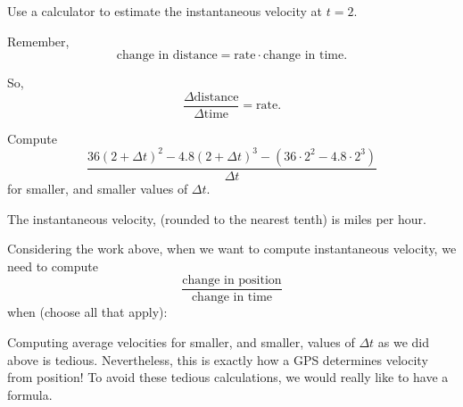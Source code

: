 \documentclass{ximera}
\begin{document}
\begin{problem}
  Use a calculator to estimate the instantaneous velocity at $t=2$.
  \begin{hint}
    Remember, 
    \[
    \text{change in distance} = \text{rate}\cdot\text{change in time}.
    \]
  \end{hint}
  \begin{hint}
    So, 
    \[
    \frac{\Delta\text{distance}}{\Delta\text{time}} = \text{rate}.
    \]
  \end{hint}
  \begin{hint}
    Compute
    \[
    \frac{36(2+\Delta t)^2 -4.8(2+\Delta t)^3 -\left(36\cdot 2^2 -4.8\cdot 2^3\right) }{\Delta t}
    \]
    for smaller, and smaller values of $\Delta t$.
  \end{hint}
  \begin{prompt}
    The instantaneous velocity, (rounded to the nearest tenth) is  miles per hour.
  \end{prompt}
\end{problem}


\begin{problem}
  Considering the work above, when we want to compute instantaneous
  velocity, we need to compute
  \[
  \frac{\text{change in position}}{\text{change in time}}
  \]
  when (choose all that apply):
 \begin{selectAll}
 \end{selectAll}
\end{problem}


Computing average velocities for smaller, and smaller, values of
$\Delta t$ as we did above is tedious. Nevertheless, this is exactly
how a GPS determines velocity from position! To avoid these tedious
calculations, we would really like to have a formula.





\end{document}
